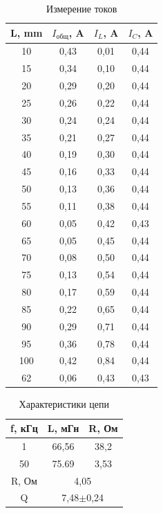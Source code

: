 \documentclass[a4paper, 12pt]{article}
\begin{document}
\begin{table}[h!]
\begin{center}
\caption{Измерение токов}
\begin{tabular}{|c|c|c|c|}
\hline
L, mm & $I_{общ}$, A & $I_{L}$, A &  $I_{C}$, A \\ \hline
10    & 0,43        & 0,01        & 0,44        \\
15    & 0,34        & 0,10        & 0,44        \\
20    & 0,29        & 0,20        & 0,44        \\
25    & 0,26        & 0,22        & 0,44        \\
30    & 0,24        & 0,24        & 0,44        \\
35    & 0,21        & 0,27        & 0,44        \\
40    & 0,19        & 0,30        & 0,44        \\
45    & 0,16        & 0,33        & 0,44        \\
50    & 0,13        & 0,36        & 0,44        \\
55    & 0,11        & 0,38        & 0,44        \\
60    & 0,05        & 0,42        & 0,43        \\
65    & 0,05        & 0,45        & 0,44        \\
70    & 0,08        & 0,50        & 0,44        \\
75    & 0,13        & 0,54        & 0,44        \\
80    & 0,17        & 0,59        & 0,44        \\
85    & 0,22        & 0,65        & 0,44        \\
90    & 0,29        & 0,71        & 0,44        \\
95    & 0,36        & 0,78        & 0,44        \\
100   & 0,42        & 0,84        & 0,44        \\ \hline
62    & 0,06        & 0,43        & 0,43        \\ \hline
\end{tabular}
\end{center}
\end{table}

\begin{table}[h!]
\begin{center}
\caption{Характеристики цепи}
\begin{tabular}{|c|cc|}
\hline
f, кГц & \multicolumn{1}{c|}{L, мГн} & R, Ом \\ \hline
1      & 66,56                       & 38,2 \\
50     & 75.69                       & 3,53 \\ \hline
R, Ом      & \multicolumn{2}{c|}{4,05}       \\ \hline
Q      & \multicolumn{2}{c|}{7,48$\pm$0,24}          \\ \hline
\end{tabular}
\end{center}
\end{table}
\end{document}
